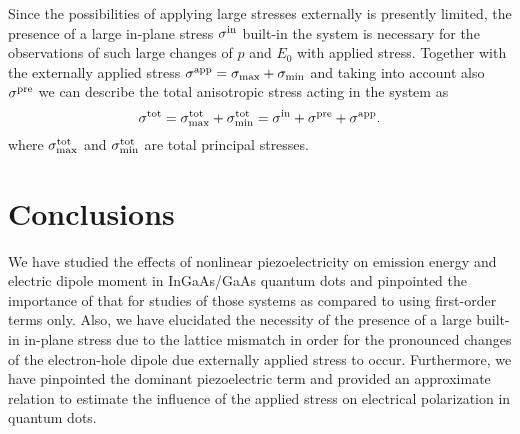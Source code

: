 %









%

Since the possibilities of applying large stresses externally is presently limited, the presence of a large in-plane stress $\sigma^{\rm{in}}$ built-in the system is necessary for the observations of such large changes of $p$ and $E_0$ with applied stress. Together with the externally applied stress $\sigma^{\rm{app}}=\sigma_{\mathrm{max}}+\sigma_{\mathrm{min}}$ and taking into account also $\sigma^{\rm{pre}}$ we can describe the total anisotropic stress acting in the system as 
%
%
%
%
%
%
\begin{equation}
\label{eq:stressTot}
\sigma^{\rm{tot}} = \sigma^{\rm{tot}}_{\mathrm{max}}+\sigma^{\rm{tot}}_{\mathrm{min}} = \sigma^{\rm{in}} + \sigma^{\rm{pre}} + \sigma^{\rm{app}}.
\end{equation}
%
where $\sigma^{\rm{tot}}_{\mathrm{max}}$ and $\sigma^{\rm{tot}}_{\mathrm{min}}$ are total principal stresses.
%



\newpage

\section{Conclusions}
We have studied the effects of nonlinear piezoelectricity on emission energy and electric dipole moment in InGaAs/GaAs quantum dots and pinpointed the importance of that for studies of those systems as compared to using first-order terms only. Also, we have elucidated the necessity of the presence of a large built-in in-plane stress due to the lattice mismatch in order for the pronounced changes of the electron-hole dipole due externally applied stress to occur. Furthermore, we have pinpointed the dominant piezoelectric term and provided an approximate relation to estimate the influence of the applied stress on electrical polarization in quantum dots.


